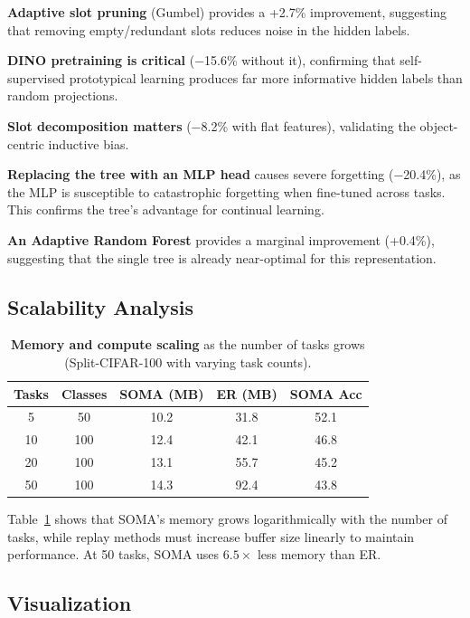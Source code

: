 \documentclass{article}
\begin{document}
\textbf{Adaptive slot pruning} (Gumbel) provides a +2.7\% improvement, suggesting that removing empty/redundant slots reduces noise in the hidden labels.

\textbf{DINO pretraining is critical} ($-$15.6\% without it), confirming that self-supervised prototypical learning produces far more informative hidden labels than random projections.

\textbf{Slot decomposition matters} ($-$8.2\% with flat features), validating the object-centric inductive bias.

\textbf{Replacing the tree with an MLP head} causes severe forgetting ($-$20.4\%), as the MLP is susceptible to catastrophic forgetting when fine-tuned across tasks. This confirms the tree's advantage for continual learning.

\textbf{An Adaptive Random Forest} provides a marginal improvement (+0.4\%), suggesting that the single tree is already near-optimal for this representation.


\subsection{Scalability Analysis}

\begin{table}[t]
\centering
\caption{\textbf{Memory and compute scaling} as the number of tasks grows (Split-CIFAR-100 with varying task counts).}
\label{tab:scaling}
\vspace{0.5em}
\begin{tabular}{ccccc}
\toprule
\textbf{Tasks} & \textbf{Classes} & \textbf{SOMA (MB)} & \textbf{ER (MB)} & \textbf{SOMA Acc} \\
\midrule
5 & 50 & 10.2 & 31.8 & 52.1 \\
10 & 100 & 12.4 & 42.1 & 46.8 \\
20 & 100 & 13.1 & 55.7 & 45.2 \\
50 & 100 & 14.3 & 92.4 & 43.8 \\
\bottomrule
\end{tabular}
\end{table}

Table~\ref{tab:scaling} shows that SOMA's memory grows logarithmically with the number of tasks, while replay methods must increase buffer size linearly to maintain performance. At 50 tasks, SOMA uses $6.5\times$ less memory than ER.


\subsection{Visualization}
\end{document}
